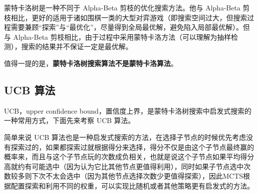 
\begin{issues}
\issueDraft
\issueTODO
\end{issues}


蒙特卡洛树是一种不同于 Alpha-Beta 剪枝的优化搜索方法。他与 Alpha-Beta 剪枝相比，更好的适用于诸如围棋一类的大型对弈游戏（即搜索空间过大，但搜索过程需要兼顾“探索”与“最优化”，尽量得到全局最优解，避免陷入局部最优解）。但与 Alpha-Beta 剪枝相比，由于过程中采用蒙特卡洛方法（可以理解为抽样检测），搜索的结果并不保证一定是最优解。

值得一提的是，\textbf{蒙特卡洛树搜索算法不是蒙特卡洛算法}。
\subsection{UCB 算法}
UCB，upper confidence bound，置信度上界，是蒙特卡洛树搜索中启发式搜索的一种常用方式，下面先来考察 UCB 算法。

简单来说 UCB 算法也是一种启发式搜索的方法，在选择子节点的时候优先考虑没有探索过的，如果都探索过就根据得分来选择，得分不仅是由这个子节点最终赢的概率来，而且与这个子节点玩的次数成负相关，也就是说这个子节点如果平均得分高就约有可能选中（因为认为它比其他节点更值得利用），同时如果子节点选中次数较多则下次不太会选中（因为其他节点选择次数少更值得探索），因此MCTS根据配置探索和利用不同的权重，可以实现比随机或者其他策略更有启发式的方法。